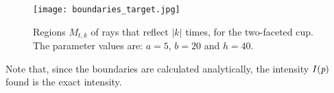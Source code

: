 \begin{figure}[htbp]
\texttt{[image: boundaries\_target.jpg]}
\caption{Regions $M_{t,k}$ of rays that reflect $|k|$ times, for the two-faceted cup. The parameter values are: $a=5$, $b=20$ and $h=40$.}
\label{boundaries_target}
\end{figure}
Note that, since the boundaries are calculated analytically, the intensity $I(\textit{p})$ found is the exact intensity.

